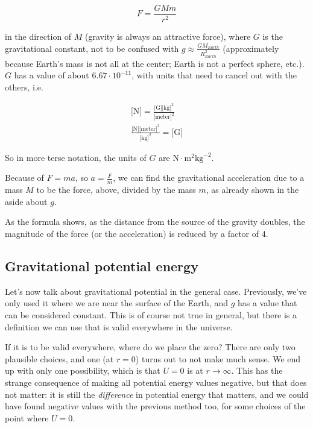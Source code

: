 \begin{equation}
F = \frac{G M m}{r^2}
\end{equation}

in the direction of $M$ (gravity is always an attractive force), where $G$ is the gravitational constant, not to be confused with $\displaystyle g \approx \frac{G M_{Earth}}{R_{Earth}^2}$ (approximately because Earth's mass is not all at the center; Earth is not a perfect sphere, etc.).\\
$G$ has a value of about $6.67 \cdot 10^{-11}$, with units that need to cancel out with the others, i.e.

\begin{align}
\text{[N]} = \frac{\text{[G]} \text{[kg]}^2}{\text{[meter]}^2}\\
\frac{\text{[N]} \text{[meter]}^2}{\text{[kg]}^2} = \text{[G]}
\end{align}

So in more terse notation, the units of $G$ are $\text{N} \cdot \text{m}^2 \text{kg}^{-2}$.

Because of $F = ma$, so $\displaystyle a = \frac{F}{m}$, we can find the gravitational acceleration due to a mass $M$ to be the force, above, divided by the mass $m$, as already shown in the aside about $g$.

As the formula shows, as the distance from the source of the gravity doubles, the magnitude of the force (or the acceleration) is reduced by a factor of 4.

\subsection{Gravitational potential energy}

Let's now talk about gravitational potential in the general case. Previously, we've only used it where we are near the surface of the Earth, and $g$ has a value that can be considered constant. This is of course not true in general, but there is a definition we can use that is valid everywhere in the universe.

If it is to be valid everywhere, where do we place the zero? There are only two plausible choices, and one (at $r = 0$) turns out to not make much sense. We end up with only one possibility, which is that $U = 0$ is at $r \to \infty$. This has the strange consequence of making all potential energy values negative, but that does not matter: it is still the \emph{difference} in potential energy that matters, and we could have found negative values with the previous method too, for some choices of the point where $U = 0$.

